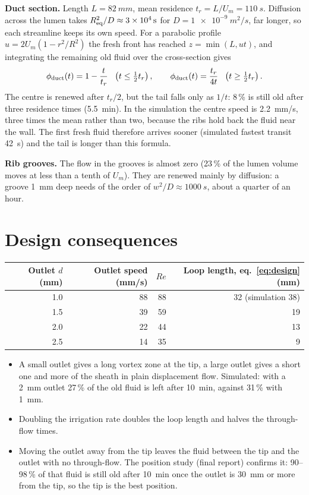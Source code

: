\documentclass[10pt,a4paper]{article}
\begin{document}
\textbf{Duct section.} Length $L=\SI{82}{mm}$, mean residence $t_r=L/U_m=\SI{110}{s}$. Diffusion across
the lumen takes $R_{\rm eq}^2/D\approx\SI{3e4}{s}$ for $D=\SI{1e-9}{m^2/s}$, far longer, so each streamline
keeps its own speed. For a parabolic profile $u=2U_m(1-r^2/R^2)$ the fresh front has reached
$z=\min(L,ut)$, and integrating the remaining old fluid over the cross-section gives
\begin{equation}
\phi_{\rm duct}(t)=1-\frac{t}{t_r}\ \ \left(t\le\tfrac12t_r\right),\qquad
\phi_{\rm duct}(t)=\frac{t_r}{4t}\ \ \left(t\ge\tfrac12t_r\right).
\end{equation}
The centre is renewed after $t_r/2$, but the tail falls only as $1/t$: 8\,\% is still old after three
residence times (\SI{5.5}{min}). In the simulation the centre speed is \SI{2.2}{mm/s}, three times the
mean rather than two, because the ribs hold back the fluid near the wall. The first fresh fluid therefore
arrives sooner (simulated fastest transit \SI{42}{s}) and the tail is longer than this formula.

\textbf{Rib grooves.} The flow in the grooves is almost zero (23\,\% of the lumen volume moves at less than
a tenth of $U_m$). They are renewed mainly by diffusion: a groove \SI{1}{mm} deep needs of the order of
$w^2/D\approx\SI{1000}{s}$, about a quarter of an hour.

\section{Design consequences}
\begin{center}\begin{tabular}{rrrr}\toprule
Outlet $d$ (mm) & Outlet speed (mm/s) & $Re$ & Loop length, eq.~\eqref{eq:design} (mm)\\ \midrule
1.0 & 88 & 88 & 32 (simulation 38)\\
1.5 & 39 & 59 & 19\\
2.0 & 22 & 44 & 13\\
2.5 & 14 & 35 & 9\\ \bottomrule
\end{tabular}\end{center}
\begin{itemize}\setlength\itemsep{0pt}
\item A small outlet gives a long vortex zone at the tip, a large outlet gives a short one and more of
the sheath in plain displacement flow. Simulated: with a \SI{2}{mm} outlet 27\,\% of the old fluid is left
after \SI{10}{min}, against 31\,\% with \SI{1}{mm}.
\item Doubling the irrigation rate doubles the loop length and halves the through-flow times.
\item Moving the outlet away from the tip leaves the fluid between the tip and the outlet with no
through-flow. The position study (final report) confirms it: 90--98\,\% of that fluid is still old after
\SI{10}{min} once the outlet is \SI{30}{mm} or more from the tip, so the tip is the best position.
\end{itemize}
\end{document}
